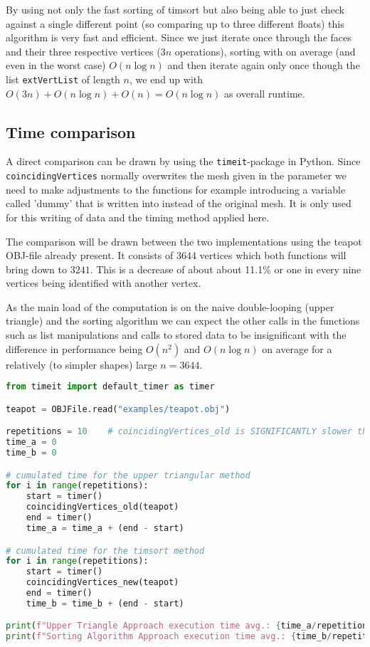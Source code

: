 By using not only the fast sorting of timsort but also being able to just check against a single different point (so comparing up to three different floats) this algorithm is very fast and efficient. Since we just iterate once through the faces and their three respective vertices ($3n$ operations), sorting with on average (and even in the worst case) $O(n\log n)$ and then iterate again only once though the list \texttt{extVertList} of length $n$, we end up with $O(3n)+O(n\log n)+O(n)=O(n\log n)$ as overall runtime.

\subsection{Time comparison}
A direct comparison can be drawn by using the \texttt{timeit}-package in Python. Since \texttt{coincidingVertices} normally overwrites the mesh given in the parameter we need to make adjustments to the functions for example introducing a variable called 'dummy' that is written into instead of the original mesh. It is only used for this writing of data and the timing method applied here.

The comparison will be drawn between the two implementations using the teapot OBJ-file already present. It consists of $3644$ vertices which both functions will bring down to $3241$. This is a decrease of about about 11.1\% or one in every nine vertices being identified with another vertex.

As the main load of the computation is on the naive double-looping (upper triangle) and the sorting algorithm we can expect the other calls in the functions such as list manipulations and calls to stored data to be insignificant with the difference in performance being $O(n^2)$ and $O(n\log n)$ on average for a relatively (to simpler shapes) large $n=3644$.

\begin{lstlisting}[language=Python, caption={Timing Comparison between Upper Triangular and Timesort Approach}, label={lst:timing_comparison}]
from timeit import default_timer as timer

teapot = OBJFile.read("examples/teapot.obj")

repetitions = 10    # coincidingVertices_old is SIGNIFICANTLY slower than the newer version, choose repetitions accordingly
time_a = 0
time_b = 0

# cumulated time for the upper triangular method
for i in range(repetitions):
    start = timer()
    coincidingVertices_old(teapot)
    end = timer()
    time_a = time_a + (end - start)

# cumulated time for the timsort method
for i in range(repetitions):
    start = timer()
    coincidingVertices_new(teapot)
    end = timer()
    time_b = time_b + (end - start)

print(f"Upper Triangle Approach execution time avg.: {time_a/repetitions} seconds")
print(f"Sorting Algorithm Approach execution time avg.: {time_b/repetitions} seconds")
\end{lstlisting}

